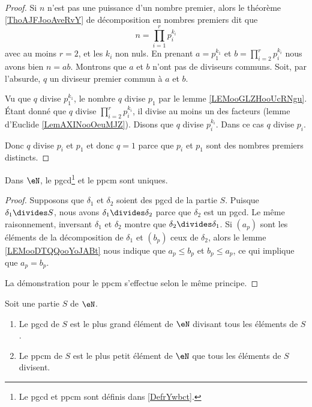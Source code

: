 \begin{proof}
	Si \( n\) n'est pas une puissance d'un nombre premier, alors le théorème \ref{ThoAJFJooAveRvY} de décomposition en nombres premiers dit que
	\begin{equation}
		n=\prod_{i=1}^rp_i^{k_i}
	\end{equation}
	avec au moins \( r=2\), et les \( k_i\) non nuls. En prenant \( a=p_1^{k_1}\) et \( b=\prod_{i=2}^rp_i^{k_i}\) nous avons bien \( n=ab\). Montrons que \( a\) et \( b\) n'ont pas de diviseurs communs. Soit, par l'absurde, \( q\) un diviseur premier commun à \( a\) et \( b\).

	Vu que \( q\) divise \( p_1^{k_1}\), le nombre \( q\) divise \( p_1\) par le lemme \ref{LEMooGLZHooUcRNgu}. Étant donné que \( q\) divise \( \prod_{i=2}^rp_i^{k_i}\), il divise au moins un des facteurs (lemme d'Euclide \ref{LemAXINooOeuMJZ}). Disons que \( q\) divise \( p_i^{k_i}\). Dans ce cas \( q\) divise \( p_i\).

	Donc \( q\) divise \( p_i\) et \( p_1\) et donc \( q=1\) parce que \( p_i\) et \( p_1\) sont des nombres premiers distincts.
\end{proof}

\begin{lemma}       \label{LEMooBJVJooFyuFeN}
	Dans \( \eN\), le pgcd\footnote{Le pgcd et ppcm sont définis dans \ref{DefrYwbct}.} et le ppcm sont uniques.
\end{lemma}

\begin{proof}
	Supposons que \( \delta_1\) et \( \delta_2\) soient des pgcd de la partie \( S\). Puisque \( \delta_1\divides S\), nous avons \( \delta_1\divides \delta_2\) parce que \( \delta_2\) est un pgcd. Le même raisonnement, inversant \( \delta_1\) et \( \delta_2\) montre que \( \delta_2\divides \delta_1\). Si \( (a_p)\) sont les éléments de la décomposition de \( \delta_1\) et \( (b_p)\) ceux de \( \delta_2\), alors le lemme \ref{LEMooDTQQooYoJABt} nous indique que \( a_p\leq b_p\) et \( b_p\leq a_p\), ce qui implique que \( a_p=b_p\).

	La démonstration pour le ppcm s'effectue selon le même principe.
\end{proof}

\begin{lemma}       \label{LEMooJIGRooARiIPC}
	Soit une partie \( S\) de \( \eN\).
	\begin{enumerate}
		\item
		      Le pgcd de \( S\) est le plus grand élément de \( \eN\) divisant tous les éléments de \( S\).
		\item
		      Le ppcm de \( S\) est le plus petit élément de \( \eN\) que tous les éléments de \( S\) divisent.
	\end{enumerate}
\end{lemma}

